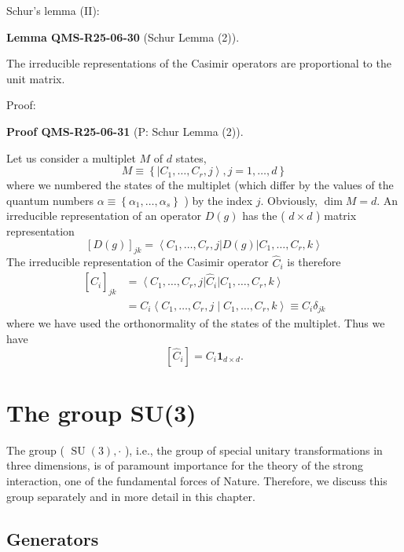 \documentclass[10pt, letterpaper]{article}
\newcommand{\CustomHeading}[3]{%
  \par\medskip\noindent%
  \textbf{#1 #2} \textnormal{(#3)}.\enskip%
}
\newenvironment{LEM}[2]{\begin{unitbox}\CustomHeading{Lemma}{#1}{#2}}{\end{unitbox}}
\newenvironment{PROOF}[2]{\begin{unitbox}\CustomHeading{Proof}{#1}{#2}}{\end{unitbox}}
\begin{document}
Schur's lemma (II): 

\begin{LEM}{QMS-R25-06-30}{Schur Lemma (2)}
The irreducible representations of the Casimir operators are proportional to the unit matrix.
\end{LEM}


Proof: 

\begin{PROOF}{QMS-R25-06-31}{P: Schur Lemma (2)}
Let us consider a multiplet $M$ of $d$ states,
$$
M \equiv\left\{\left|C_{1}, \ldots, C_{r}, j\right\rangle, j=1, \ldots, d\right\}
$$
where we numbered the states of the multiplet (which differ by the values of the quantum numbers $\alpha \equiv\left\{\alpha_{1}, \ldots, \alpha_{s}\right\}$ ) by the index $j$. Obviously, $\operatorname{dim} M=d$. An irreducible representation of an operator $D(g)$ has the ( $d \times d$ ) matrix representation
$$
[D(g)]_{j k}=\left\langle C_{1}, \ldots, C_{r}, j\right| D(g)\left|C_{1}, \ldots, C_{r}, k\right\rangle
$$
The irreducible representation of the Casimir operator $\hat{C}_{i}$ is therefore
$$
\begin{aligned}
{\left[\hat{C}_{i}\right]_{j k} } & =\left\langle C_{1}, \ldots, C_{r}, j\right| \hat{C}_{i}\left|C_{1}, \ldots, C_{r}, k\right\rangle \\
& =C_{i}\left\langle C_{1}, \ldots, C_{r}, j \mid C_{1}, \ldots, C_{r}, k\right\rangle \equiv C_{i} \delta_{j k}
\end{aligned}
$$
where we have used the orthonormality of the states of the multiplet. Thus we have
$$
\left[\hat{C}_{i}\right]=C_{i} \mathbf{1}_{d \times d}.
$$
\end{PROOF}






\pagebreak


\section{The group SU(3)}


The group ( $\operatorname{SU}(3), \cdot$ ), i.e., the group of special unitary transformations in three dimensions, is of paramount importance for the theory of the strong interaction, one of the fundamental forces of Nature. Therefore, we discuss this group separately and in more detail in this chapter.



\subsection{Generators}
\end{document}
